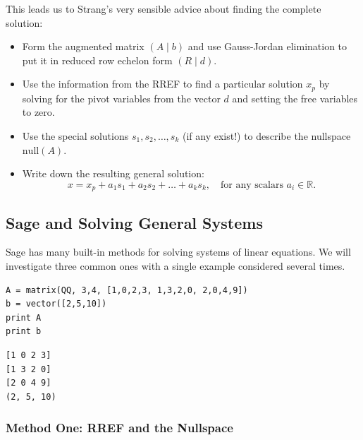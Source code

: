 \documentclass[10pt,]{book}
\theoremstyle{plain}
\theoremstyle{definition}
\numberwithin{equation}{section}
\begin{document}
      This leads us to Strang's very sensible advice about finding the
      complete solution:
\begin{itemize}
\item{}
        Form the augmented matrix \(\left( A \mid b \right)\) and use
        Gauss-Jordan elimination to put it in reduced row echelon form
        \(\left( R \mid d \right)\).
      \item{}
        Use the information from the RREF to find a particular solution
        \(x_p\) by solving for the pivot variables from the vector
        \(d\) and setting the free variables to zero.
      \item{}
        Use the special solutions \(s_1, s_2, \dots, s_k\)
        (if any exist!) to describe the nullspace \(\mathrm{null}(A)\).
      \item{}
        Write down the resulting general solution:
        \[
          x = x_p + a_1 s_1 + a_2 s_2 + \dots + a_k s_k,
          \quad \text{for any scalars } a_i \in \mathbb{R}.
        \]
      \end{itemize}
\typeout{************************************************}
\typeout{************************************************}
\subsection[Sage and Solving General Systems]{Sage and Solving General Systems}\label{subsection-76}

      Sage has many built-in methods for solving systems of linear equations.
      We will investigate three common ones with a single example considered
      several times.
\begin{lstlisting}[style=sageinput]
A = matrix(QQ, 3,4, [1,0,2,3, 1,3,2,0, 2,0,4,9])
b = vector([2,5,10])
print A
print b
\end{lstlisting}
\begin{lstlisting}[style=sageoutput]
[1 0 2 3]
[1 3 2 0]
[2 0 4 9]
(2, 5, 10)
\end{lstlisting}
\typeout{************************************************}
\typeout{************************************************}
\subsubsection[Method One: RREF and the Nullspace]{Method One: RREF and the Nullspace}\label{subsubsection-36}
\end{document}
